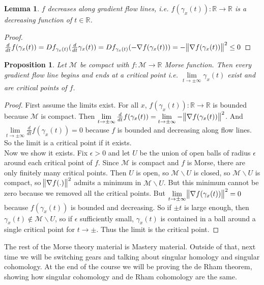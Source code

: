 \documentclass[10pt]{article}
\theoremstyle{plain}
\newtheorem{lemma}[thm]{Lemma}
\newtheorem{prop}[thm]{Proposition}
\theoremstyle{definition}
\newcommand{\Real}{\mathbb{R}}
\newcommand{\man}{\mathcal{M}}
\newcommand{\deriv}{d}
\newcommand{\dt}{\deriv t}
\newcommand{\tdiffof}[1]{\frac{\deriv #1}{\dt}}
\begin{document}
\begin{lemma}
    $f$ decreases along gradient flow lines, i.e. $f(\gamma_x(t)):\Real \to \Real$ is a decreasing function of $t\in\Real$.
\end{lemma}
\begin{proof}
    $\tdiffof{} f(\gamma_x(t)) = Df_{\gamma_x(t)} (\tdiffof{} \gamma_x(t)) = Df_{\gamma_x(t)}(- \nabla f(\gamma_x(t))) = - \norm{\nabla f(\gamma_x(t))}^2 \leq 0$
\end{proof}

\begin{prop}
   Let $\man$ be compact with $f:\man\to\Real$ Morse function. Then every gradient flow line begins and ends at a critical point i.e. $\lim \limits_{t \to \pm \infty} \gamma_x(t) $ exist and are critical points of $f$.
\end{prop}

\begin{proof}
    First assume the limits exist. For all $x$, $f(\gamma_x(t)) : \Real \to \Real$ is bounded because $\man$ is compact. Then $\lim \limits_{t \to \pm \infty} \tdiffof{} f(\gamma_x(t)) = \lim \limits_{t \to \pm \infty} - \norm{\nabla f(\gamma_x(t))}^2$. And $\lim \limits_{t \to \pm \infty} \tdiffof{}f(\gamma_x(t)) = 0$ because $f$ is bounded and decreasing along flow lines. So the limit is a critical point if it exists.\\
    Now we show it exists. Fix $\epsilon> 0$ and let $U $ be the union of open balls of radius $\epsilon$ around each critical point of $f.$ Since $\man$ is compact and $f$ is Morse, there are only finitely many critical points. Then $U$ is open, so $\man \backslash U$ is closed, so $\man \backslash U$ is compact, so $\norm{\nabla f(.)}^2$ admits a minimum in $\man \backslash U$. But this minimum cannot be zero because we removed all the critical points. But $\lim \limits_{t \to \pm \infty}\norm{\nabla f(\gamma_x(t))}^2 = 0$ because $f(\gamma_x(t))$ is bounded and decreasing. So if $\pm t$ is large enough, then $\gamma_x(t) \not\in \man \backslash U$, so if $\epsilon $ sufficiently small, $\gamma_x(t)$ is contained in a ball around a single critical point for $t \to \pm$. Thus the limit is the critical point. 
\end{proof}
The rest of the Morse theory material is Mastery material. Outside of that, next time we will be switching gears and talking about singular homology and singular cohomology. At the end of the course we will be proving the de Rham theorem, showing how singular cohomology and de Rham cohomology are the same.
\end{document}
